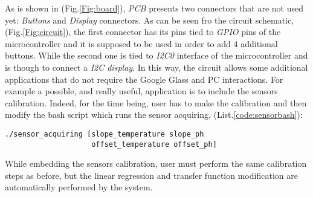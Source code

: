 As is shown in (Fig.\ref{Fig:board}), \textit{PCB} presents two connectors that are not used yet: \textit{Buttons} and \textit{Display} connectors. As can be seen fro the circuit schematic, (Fig.\ref{Fig:circuit}), the first connector has its pins tied to \textit{GPIO} pins of the microcontroller and it is supposed to be used in order to add 4 additional buttons. While the second one is tied to \textit{I2C0} interface of the microcontroller and is though to connect a \textit{I2C display}. In this way, the circuit allows some additional applications that do not require the Google Glass and PC interactions. For example a possible, and really useful, application is to include the sensors calibration. Indeed, for the time being, user has to make the calibration and then modify the bash script which runs the sensor acquiring, (List.\ref{code:sensorbash}):

\begin{lstlisting}[basicstyle=\footnotesize]
./sensor_acquiring [slope_temperature slope_ph 
                    offset_temperature offset_ph]
\end{lstlisting}

While embedding the sensors calibration, user must perform the same calibration steps as before, but the linear regression and transfer function modification  are automatically performed by the system.

\cite{ALTIOT} \cite{BGGD} \cite{CISCOIOT} \cite{DDGG} \cite{DFTSA} \cite{EBB} \cite{GGC} \cite{OAAH} \cite{PDGFRE} \cite{PGG} \cite{PSLE} \cite{SNOA529A} \cite{SNOSAW6E} \cite{SNVS053E} \cite{UGAE}